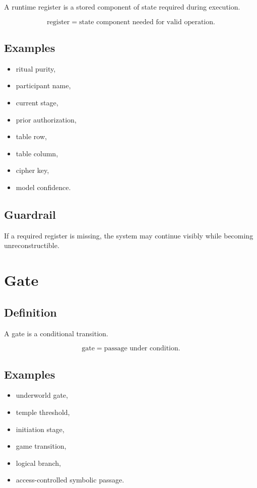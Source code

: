 \documentclass[11pt]{book}
\begin{document}
A runtime register is a stored component of state required during execution.

\[
\text{register} = \text{state component needed for valid operation}.
\]

\subsection*{Examples}

\begin{itemize}
    \item ritual purity,
    \item participant name,
    \item current stage,
    \item prior authorization,
    \item table row,
    \item table column,
    \item cipher key,
    \item model confidence.
\end{itemize}

\subsection*{Guardrail}

If a required register is missing, the system may continue visibly while becoming unreconstructible.

\section{Gate}

\subsection*{Definition}

A gate is a conditional transition.

\[
\text{gate} = \text{passage under condition}.
\]

\subsection*{Examples}

\begin{itemize}
    \item underworld gate,
    \item temple threshold,
    \item initiation stage,
    \item game transition,
    \item logical branch,
    \item access-controlled symbolic passage.
\end{itemize}
\end{document}
